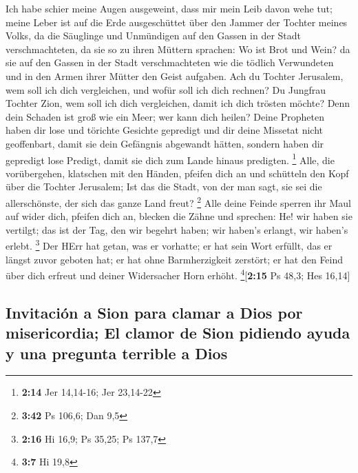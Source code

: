  Ich habe schier meine Augen ausgeweint, dass mir mein
Leib davon wehe tut; meine Leber ist auf die Erde ausgeschüttet über den
Jammer der Tochter meines Volks, da die Säuglinge und Unmündigen auf den
Gassen in der Stadt verschmachteten,  da sie so zu ihren
Müttern sprachen: Wo ist Brot und Wein? da sie auf den Gassen in der
Stadt verschmachteten wie die tödlich Verwundeten und in den Armen ihrer
Mütter den Geist aufgaben.  Ach du Tochter Jerusalem, wem
soll ich dich vergleichen, und wofür soll ich dich rechnen? Du Jungfrau
Tochter Zion, wem soll ich dich vergleichen, damit ich dich trösten
möchte? Denn dein Schaden ist groß wie ein Meer; wer kann dich heilen?
 Deine Propheten haben dir lose und törichte Gesichte
gepredigt und dir deine Missetat nicht geoffenbart, damit sie dein
Gefängnis abgewandt hätten, sondern haben dir gepredigt lose Predigt,
damit sie dich zum Lande hinaus predigten. \footnote{\textbf{2:14} Jer
  14,14-16; Jer 23,14-22}  Alle, die vorübergehen,
klatschen mit den Händen, pfeifen dich an und schütteln den Kopf über
die Tochter Jerusalem; Ist das die Stadt, von der man sagt, sie sei die
allerschönste, der sich das ganze Land freut? \footnote{\textbf{3:42} Ps
  106,6; Dan 9,5}  Alle deine Feinde sperren ihr Maul auf
wider dich, pfeifen dich an, blecken die Zähne und sprechen: He! wir
haben sie vertilgt; das ist der Tag, den wir begehrt haben; wir haben's
erlangt, wir haben's erlebt. \footnote{\textbf{2:16} Hi 16,9; Ps 35,25;
  Ps 137,7}  Der HErr hat getan, was er vorhatte; er hat
sein Wort erfüllt, das er längst zuvor geboten hat; er hat ohne
Barmherzigkeit zerstört; er hat den Feind über dich erfreut und deiner
Widersacher Horn erhöht. \footnote{\textbf{3:7} Hi 19,8}{[}\textbf{2:15}
Ps 48,3; Hes 16,14{]}

\hypertarget{invitaciuxf3n-a-sion-para-clamar-a-dios-por-misericordia-el-clamor-de-sion-pidiendo-ayuda-y-una-pregunta-terrible-a-dios}{%
\subsection{Invitación a Sion para clamar a Dios por misericordia; El
clamor de Sion pidiendo ayuda y una pregunta terrible a
Dios}\label{invitaciuxf3n-a-sion-para-clamar-a-dios-por-misericordia-el-clamor-de-sion-pidiendo-ayuda-y-una-pregunta-terrible-a-dios}}

